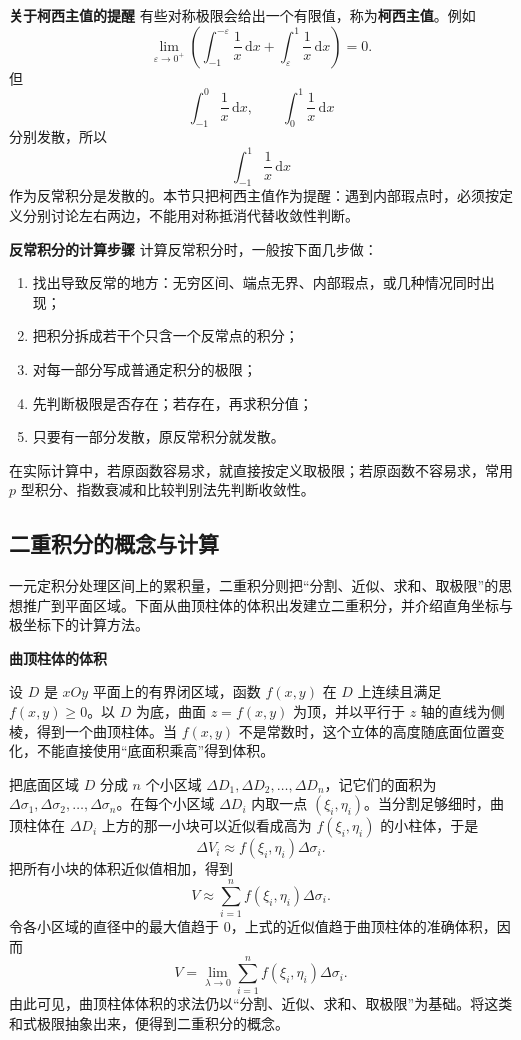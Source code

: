 \documentclass[fontset=fandol]{ctexart}
\newenvironment{custom}[1]{\par\noindent\textbf{#1}\quad}{\par\vspace{0.8em}}
\newcommand{\dd}{\mathrm{d}}
\begin{document}
\begin{custom}{关于柯西主值的提醒}
有些对称极限会给出一个有限值，称为\textbf{柯西主值}。例如
\[
\lim_{\varepsilon\to0^+}\left(\int_{-1}^{-\varepsilon}\frac1x\,\dd x+\int_{\varepsilon}^{1}\frac1x\,\dd x\right)=0.
\]
但
\[
\int_{-1}^{0}\frac1x\,\dd x,\qquad \int_{0}^{1}\frac1x\,\dd x
\]
分别发散，所以
\[
\int_{-1}^{1}\frac1x\,\dd x
\]
作为反常积分是发散的。本节只把柯西主值作为提醒：遇到内部瑕点时，必须按定义分别讨论左右两边，不能用对称抵消代替收敛性判断。
\end{custom}

\begin{custom}{反常积分的计算步骤}
计算反常积分时，一般按下面几步做：
\begin{enumerate}
\item 找出导致反常的地方：无穷区间、端点无界、内部瑕点，或几种情况同时出现；
\item 把积分拆成若干个只含一个反常点的积分；
\item 对每一部分写成普通定积分的极限；
\item 先判断极限是否存在；若存在，再求积分值；
\item 只要有一部分发散，原反常积分就发散。
\end{enumerate}
在实际计算中，若原函数容易求，就直接按定义取极限；若原函数不容易求，常用 $p$ 型积分、指数衰减和比较判别法先判断收敛性。
\end{custom}

\subsection{二重积分的概念与计算}

一元定积分处理区间上的累积量，二重积分则把“分割、近似、求和、取极限”的思想推广到平面区域。下面从曲顶柱体的体积出发建立二重积分，并介绍直角坐标与极坐标下的计算方法。

\textbf{曲顶柱体的体积}

设 $D$ 是 $xOy$ 平面上的有界闭区域，函数 $f(x,y)$ 在 $D$ 上连续且满足 $f(x,y)\geq0$。以 $D$ 为底，曲面 $z=f(x,y)$ 为顶，并以平行于 $z$ 轴的直线为侧棱，得到一个曲顶柱体。当 $f(x,y)$ 不是常数时，这个立体的高度随底面位置变化，不能直接使用“底面积乘高”得到体积。

把底面区域 $D$ 分成 $n$ 个小区域 $\Delta D_1,\Delta D_2,\ldots,\Delta D_n$，记它们的面积为 $\Delta\sigma_1,\Delta\sigma_2,\ldots,\Delta\sigma_n$。在每个小区域 $\Delta D_i$ 内取一点 $(\xi_i,\eta_i)$。当分割足够细时，曲顶柱体在 $\Delta D_i$ 上方的那一小块可以近似看成高为 $f(\xi_i,\eta_i)$ 的小柱体，于是
\[
\Delta V_i\approx f(\xi_i,\eta_i)\Delta\sigma_i.
\]
把所有小块的体积近似值相加，得到
\[
V\approx\sum_{i=1}^n f(\xi_i,\eta_i)\Delta\sigma_i.
\]
令各小区域的直径中的最大值趋于 $0$，上式的近似值趋于曲顶柱体的准确体积，因而
\[
V=\lim_{\lambda\to0}\sum_{i=1}^n f(\xi_i,\eta_i)\Delta\sigma_i.
\]
由此可见，曲顶柱体体积的求法仍以“分割、近似、求和、取极限”为基础。将这类和式极限抽象出来，便得到二重积分的概念。
\end{document}
